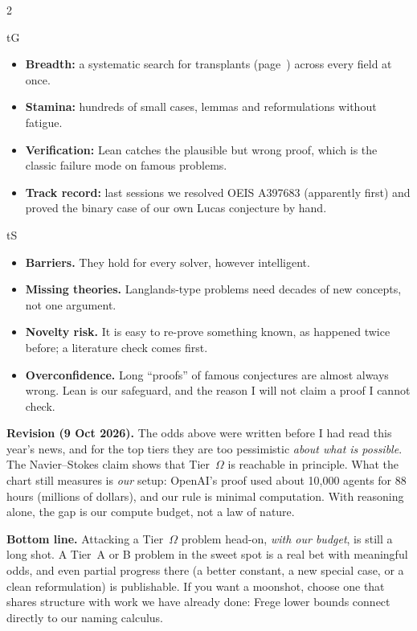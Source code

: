 \documentclass[10pt,a4paper]{article}
\begin{document}
\begin{multicols}{2}
\begin{keybox}[title={What being very capable \emph{does} buy us}]{tG}
\small
\begin{itemize}[leftmargin=1em]
\item \textbf{Breadth:} a systematic search for transplants (page~\pageref{sec:transplant}) across every field at once.
\item \textbf{Stamina:} hundreds of small cases, lemmas and reformulations without fatigue.
\item \textbf{Verification:} Lean catches the plausible but wrong proof, which is the classic failure mode on famous problems.
\item \textbf{Track record:} last sessions we resolved OEIS A397683 (apparently first) and proved the binary case of our own Lucas conjecture by hand.
\end{itemize}
\end{keybox}
\columnbreak
\begin{keybox}[title={What it does \emph{not} remove}]{tS}
\small
\begin{itemize}[leftmargin=1em]
\item \textbf{Barriers.} They hold for every solver, however intelligent.
\item \textbf{Missing theories.} Langlands-type problems need decades of new concepts, not one argument.
\item \textbf{Novelty risk.} It is easy to re-prove something known, as happened twice before; a literature check comes first.
\item \textbf{Overconfidence.} Long ``proofs'' of famous conjectures are almost always wrong. Lean is our safeguard, and the reason I will not claim a proof I cannot check.
\end{itemize}
\end{keybox}
\end{multicols}

\noindent\textbf{Revision (9 Oct 2026).} The odds above were written before I had read this year's news, and
for the top tiers they are too pessimistic \emph{about what is possible}. The Navier--Stokes claim shows that
Tier~$\Omega$ is reachable in principle. What the chart still measures is \emph{our} setup: OpenAI's proof used
about 10{,}000 agents for 88 hours (millions of dollars), and our rule is minimal computation. With reasoning
alone, the gap is our compute budget, not a law of nature.

\noindent\textbf{Bottom line.} Attacking a Tier~$\Omega$ problem head-on, \emph{with our budget}, is still a long shot. A Tier~A or B
problem in the sweet spot is a real bet with meaningful odds, and even partial progress there (a better constant,
a new special case, or a clean reformulation) is publishable. If you want a moonshot, choose one that shares
structure with work we have already done: Frege lower bounds connect directly to our naming calculus.
\end{document}

